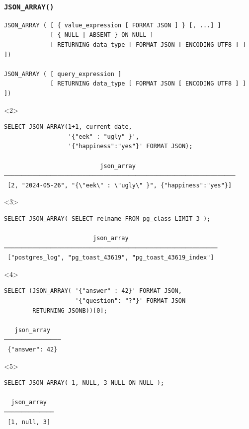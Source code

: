 \begin{frame}[fragile]
  \frametitle{\texttt{JSON\_ARRAY()}}
  \begin{lstlisting}
JSON_ARRAY ( [ { value_expression [ FORMAT JSON ] } [, ...] ]
             [ { NULL | ABSENT } ON NULL ]
             [ RETURNING data_type [ FORMAT JSON [ ENCODING UTF8 ] ] ])

JSON_ARRAY ( [ query_expression ]
             [ RETURNING data_type [ FORMAT JSON [ ENCODING UTF8 ] ] ])
  \end{lstlisting}

    \begin{onlyenv}<2>
      \begin{lstlisting}
SELECT JSON_ARRAY(1+1, current_date,
                  '{"eek" : "ugly" }',
                  '{"happiness":"yes"}' FORMAT JSON);

                           json_array                            
─────────────────────────────────────────────────────────────────
 [2, "2024-05-26", "{\"eek\" : \"ugly\" }", {"happiness":"yes"}]
    \end{lstlisting}
    \end{onlyenv}
    \begin{onlyenv}<3>
      \begin{lstlisting}
SELECT JSON_ARRAY( SELECT relname FROM pg_class LIMIT 3 );

                         json_array                         
────────────────────────────────────────────────────────────
 ["postgres_log", "pg_toast_43619", "pg_toast_43619_index"]
    \end{lstlisting}
    \end{onlyenv}

    \begin{onlyenv}<4>
      \begin{lstlisting}
SELECT (JSON_ARRAY( '{"answer" : 42}' FORMAT JSON,
                    '{"question": "?"}' FORMAT JSON
        RETURNING JSONB))[0];

   json_array   
────────────────
 {"answer": 42}
      \end{lstlisting}
    \end{onlyenv}

    \begin{onlyenv}<5>
      \begin{lstlisting}
SELECT JSON_ARRAY( 1, NULL, 3 NULL ON NULL );

  json_array    
──────────────
 [1, null, 3]
      \end{lstlisting}
    \end{onlyenv}
\end{frame}

